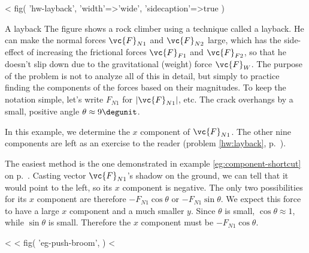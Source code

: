 \pagebreak

<%
  fig(
    'hw-layback',
    {
      'width'=>'wide',
      'sidecaption'=>true
    }
  )

\begin{eg}{A layback}\label{eg:layback}
The figure shows a rock climber 
using a technique called a layback. He can make the normal forces
$\vc{F}_{N1}$ and $\vc{F}_{N2}$ large, which has the side-effect of increasing
the frictional forces $\vc{F}_{F1}$ and $\vc{F}_{F2}$, so that he doesn't slip
down due to the gravitational (weight) force $\vc{F}_W$. The purpose of the
problem is not to analyze all of this in detail, but simply to practice
finding the components of the forces based on their magnitudes.
To keep the notation simple, let's write $F_{N1}$ for 
$|\vc{F}_{N1}|$, etc. The crack overhangs by a small, positive angle $\theta\approx9\degunit$.

In this example, we 
 determine the
$x$ component of $\vc{F}_{N1}$. The other nine components are left as an exercise to
the reader (problem \ref{hw:layback}, p.~\pageref{hw:layback}).

The easiest method is the one demonstrated in example \ref{eg:component-shortcut}
on p.~\pageref{eg:component-shortcut}. Casting vector $\vc{F}_{N1}$'s shadow on the ground,
we can tell that it would point to the left, so its $x$ component is
negative. The only two possibilities for its $x$ component are therefore
$-F_{N1}\cos\theta$ or $-F_{N1}\sin\theta$. We expect this force to have
a large $x$ component and a much smaller $y$. Since $\theta$ is small,
$\cos\theta\approx 1$, while $\sin\theta$ is small. Therefore
the $x$ component must be $-F_{N1}\cos\theta$.
\end{eg}

<%
<%
  fig(
    'eg-push-broom',
  )
<%

